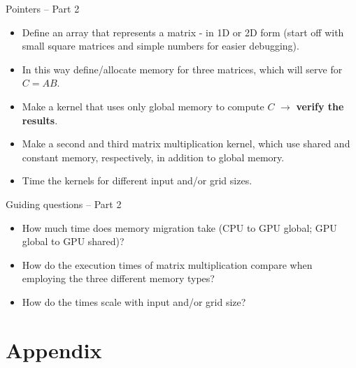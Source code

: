 \documentclass[11pt,t]{beamer}
\begin{document}
\begin{frame}{Pointers -- Part 2}
\small{
    \begin{itemize}\setlength\itemsep{0.75em}
        \item Define an array that represents a matrix - in 1D or 2D form (start off with small square matrices and simple numbers for easier debugging).
        \item In this way define/allocate memory for three matrices, which will serve for $C = AB$.
        \item Make a kernel that uses only global memory to compute $C$ $\rightarrow$ \textbf{verify the results}.
        \item Make a second and third matrix multiplication kernel, which use shared and constant memory, respectively, in addition to global memory.
        \item Time the kernels for different input and/or grid sizes. 
    \end{itemize}
}
\end{frame}


\begin{frame}{Guiding questions -- Part 2}
\small{
    \begin{itemize}\setlength\itemsep{0.75em}
        \item How much time does memory migration take (CPU to GPU global; GPU global to GPU shared)?
        \item How do the execution times of matrix multiplication compare when employing the three different memory types?
        \item How do the times scale with input and/or grid size?
    \end{itemize}
}
\end{frame}



\section{Appendix}
\end{document}
